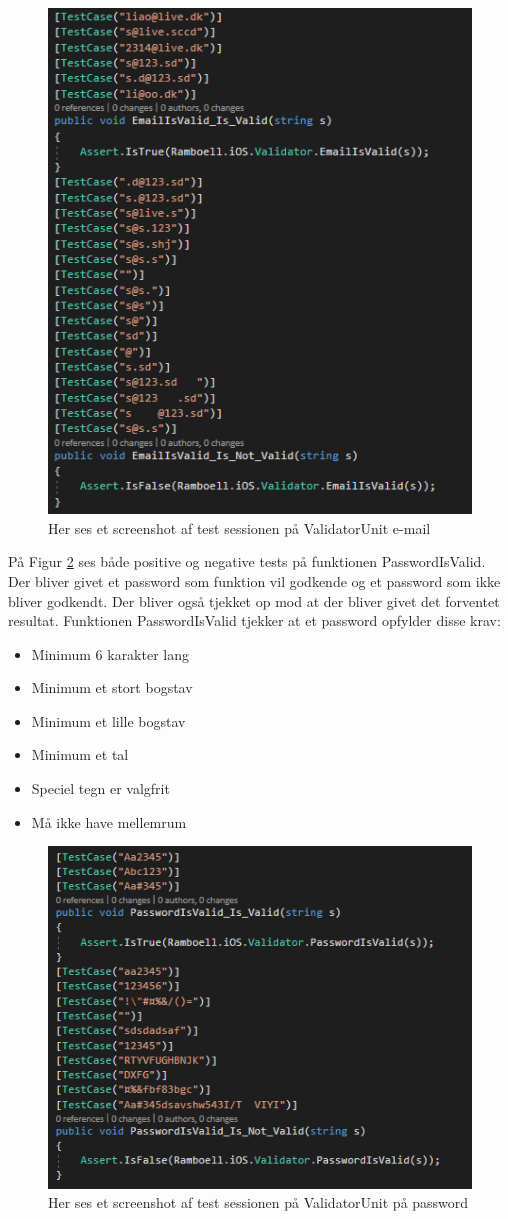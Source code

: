 \begin{figure}[H]
	\centering
	\includegraphics[width=0.6\linewidth]{Unit/ValidatorUnitEmail.PNG}
	\caption{Her ses et screenshot af test sessionen på ValidatorUnit e-mail}
	\label{fig:ValidatorUnitEmail}
\end{figure}

\clearpage

På Figur \ref{fig:ValidatorUnitPassword} ses både positive og negative tests på funktionen PasswordIsValid. Der bliver givet et password som funktion vil godkende og et password som ikke bliver godkendt. Der bliver også tjekket op mod at der bliver givet det forventet resultat. Funktionen PasswordIsValid tjekker at et password opfylder disse krav: \\
\begin{itemize}
	\item Minimum 6 karakter lang
	\item Minimum et stort bogstav
	\item Minimum et lille bogstav
	\item Minimum et tal
	\item Speciel tegn er valgfrit
	\item Må ikke have mellemrum
\end{itemize}

\begin{figure}[H]
	\centering
	\includegraphics[width=0.6\linewidth]{Unit/ValidatorUnitPassword.PNG}
	\caption{Her ses et screenshot af test sessionen på ValidatorUnit på password}
	\label{fig:ValidatorUnitPassword}
\end{figure}


